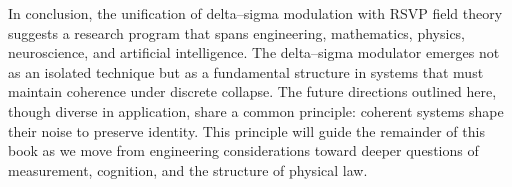 In conclusion, the unification of delta–sigma modulation with RSVP field theory suggests a research program that spans engineering, mathematics, physics, neuroscience, and artificial intelligence. The delta–sigma modulator emerges not as an isolated technique but as a fundamental structure in systems that must maintain coherence under discrete collapse. The future directions outlined here, though diverse in application, share a common principle: coherent systems shape their noise to preserve identity. This principle will guide the remainder of this book as we move from engineering considerations toward deeper questions of measurement, cognition, and the structure of physical law.


